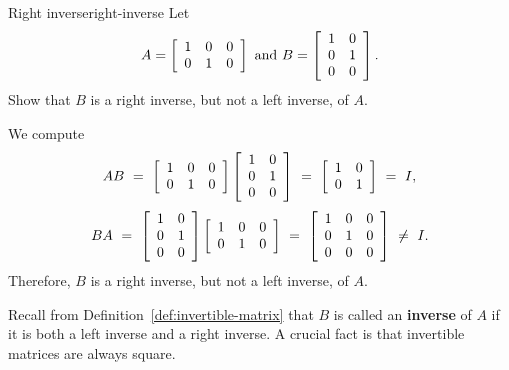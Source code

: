\documentclass{ximera}
\begin{document}
\begin{example}{Right inverse}{right-inverse}
  Let
  \begin{equation*}
    A = \startmat{rrr}
      1 & 0 & 0 \\
      0 & 1 & 0 \\
    \stopmat
    \quad\mbox{and}\quad
    B = \startmat{rr}
      1 & 0 \\
      0 & 1 \\
      0 & 0 \\
    \stopmat.
  \end{equation*}
  Show that $B$ is a right inverse, but not a left inverse, of $A$.
\end{example}



\begin{solution}
  We compute
  \begin{equation*}
    AB
    ~=~ \startmat{rrr}
      1 & 0 & 0 \\
      0 & 1 & 0 \\
    \stopmat
    \startmat{rr}
      1 & 0 \\
      0 & 1 \\
      0 & 0 \\
    \stopmat
    ~=~ \startmat{rrr}
      1 & 0 \\
      0 & 1 \\
    \stopmat
    ~=~ I,
  \end{equation*}
  \begin{equation*}
    BA
    ~=~ \startmat{rr}
      1 & 0 \\
      0 & 1 \\
      0 & 0 \\
    \stopmat
    \startmat{rrr}
      1 & 0 & 0 \\
      0 & 1 & 0 \\
    \stopmat
    ~=~ \startmat{rrr}
      1 & 0 & 0 \\
      0 & 1 & 0 \\
      0 & 0 & 0 \\
    \stopmat
    ~\neq~ I.
  \end{equation*}
  Therefore, $B$ is a right inverse, but not a left inverse, of $A$.
\end{solution}

Recall from Definition~\ref{def:invertible-matrix} that $B$ is called
an \textbf{inverse}%
%
 of $A$ if it is both a left inverse and a right
inverse. A crucial fact is that invertible matrices are always square.
\end{document}
